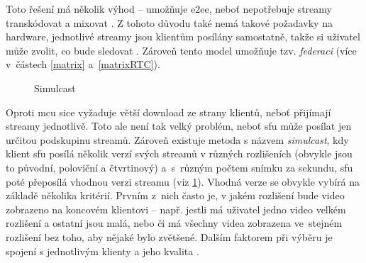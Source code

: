 Toto řešení má několik výhod -- umožňuje \gls{e2ee}, neboť nepotřebuje streamy
transkódovat a mixovat \parencite{WebRTCHacks-TrueE2EE}. Z tohoto důvodu také
nemá takové požadavky na hardware, jednotlivé streamy jsou klientům posílány
samostatně, takže si uživatel může zvolit, co bude sledovat
\parencite{Red5Pro-WebRTCScalingApproaches}. Zároveň tento model umožňuje tzv.
\textit{federaci} (více v~částech \ref{matrix} a~\ref{matrixRTC}).

\begin{figure}[H]
    \centering
    \caption{Simulcast}
    \label{simulcast}
\end{figure}

Oproti \gls{mcu} sice vyžaduje větší download ze strany klientů, neboť přijímají
streamy jednotlivě. Toto ale není tak velký problém, neboť \gls{sfu} může
posílat jen určitou podskupinu streamů. Zároveň existuje metoda s názvem
\textit{simulcast}, kdy klient \gls{sfu} posílá několik verzí svých streamů v
různých rozlišeních (obvykle jsou to původní, poloviční a čtvrtinový) a~s~různým
počtem snímku za sekundu, \gls{sfu} poté přeposílá vhodnou verzi streamu (viz
\ref{simulcast}). Vhodná verze se obvykle vybírá na základě několika kritérií.
Prvním z~nich často je, v jakém rozlišení bude video zobrazeno na koncovém
klientovi -- např. jestli má uživatel jedno video velkém rozlišení a ostatní
jsou malá, nebo či má všechny videa zobrazena ve~stejném rozlišení bez toho, aby
nějaké bylo zvětšené. Dalším faktorem při výběru je spojení s jednotlivým
klienty a jeho kvalita \parencite{LiveKit-SimulcastIntroduction}.
